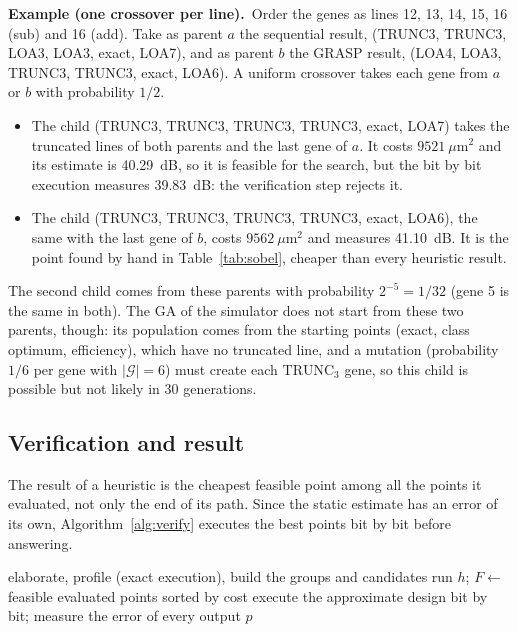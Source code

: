 \documentclass[11pt,a4paper]{article}
\newcommand{\examplebox}[2]{\par\medskip\noindent\colorbox{tabAzul!6}{\begin{minipage}{\dimexpr\linewidth-2\fboxsep}
  \textbf{Example (#1).}\ #2\end{minipage}}\par\medskip}
\begin{document}
\examplebox{one crossover per line}{Order the genes as lines 12, 13, 14, 15, 16 (sub) and 16 (add). Take as parent
$a$ the sequential result, (TRUNC3, TRUNC3, LOA3, LOA3, exact, LOA7), and as parent $b$ the GRASP result, (LOA4,
LOA3, TRUNC3, TRUNC3, exact, LOA6). A uniform crossover takes each gene from $a$ or $b$ with probability $1/2$.
\begin{itemize}
  \item The child (TRUNC3, TRUNC3, TRUNC3, TRUNC3, exact, LOA7) takes the truncated lines of both parents and the last
    gene of $a$. It costs $9521\ \mu\text{m}^2$ and its estimate is 40.29~dB, so it is feasible for the search, but
    the bit by bit execution measures 39.83~dB: the verification step rejects it.
  \item The child (TRUNC3, TRUNC3, TRUNC3, TRUNC3, exact, LOA6), the same with the last gene of $b$, costs
    $9562\ \mu\text{m}^2$ and measures 41.10~dB. It is the point found by hand in Table~\ref{tab:sobel}, cheaper than
    every heuristic result.
\end{itemize}
The second child comes from these parents with probability $2^{-5} = 1/32$ (gene 5 is the same in both). The GA of the
simulator does not start from these two parents, though: its population comes from the starting points (exact,
class optimum, efficiency), which have no truncated line, and a mutation (probability $1/6$ per gene with
$|\mathcal{G}| = 6$) must create each $\text{TRUNC}_3$ gene, so this child is possible but not likely in 30
generations.}

\subsection{Verification and result}\label{sec:verify}

The result of a heuristic is the cheapest feasible point among all the points it evaluated, not only the end of its
path. Since the static estimate has an error of its own, Algorithm~\ref{alg:verify} executes the best points bit by bit
before answering.

\begin{algorithm}[H]
\caption{Exploration driver}\label{alg:verify}
\begin{algorithmic}[1]
\State elaborate, profile (exact execution), build the groups and candidates
  \State run $h$; $F \gets$ feasible evaluated points sorted by cost
    \State execute the approximate design bit by bit; measure the error of every output
     \Return $p$
    \EndIf
  \EndFor
\EndFor
\end{algorithmic}
\end{algorithm}
\end{document}
